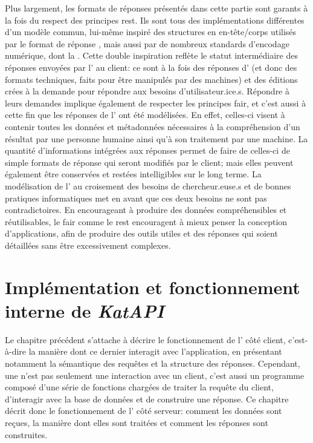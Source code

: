 Plus largement, les formats de réponses présentés dans cette partie sont garants à la fois du respect des principes \gls{rest}. Ils sont tous des implémentations différentes d'un modèle commun, lui-même inspiré des structures en en-tête/corps utilisés par le format de réponse \sparql{}, mais aussi par de nombreux standards d'encodage numérique, dont la \tei{}. Cette double inspiration reflète le statut intermédiaire des réponses envoyées par l'\api{} au client: ce sont à la fois des réponses d'\api{} (et donc des formats techniques, faits pour être manipulés par des machines) et des éditions crées à la demande pour répondre aux besoins d'utilisateur.ice.s. Répondre à leurs demandes implique également de respecter les principes \gls{fair}, et c'est aussi à cette fin que les réponses de l'\api{} ont été modélisées. En effet, celles-ci visent à contenir toutes les données et métadonnées nécessaires à la compréhension d'un résultat par une personne humaine ainsi qu'à son traitement par une machine. La quantité d'informations intégrées aux réponses permet de faire de celles-ci de simple formats de réponse qui seront modifiés par le client; mais elles peuvent également être conservées et restées intelligibles sur le long terme. La modélisation de l'\api{} au croisement des besoins de chercheur.euse.s et de bonnes pratiques informatiques met en avant que ces deux besoins ne sont pas contradictoires. En encourageant à produire des données compréhensibles et réutilisables, le \gls{fair} comme le \gls{rest} encouragent à mieux penser la conception d'applications, afin de produire des outils utiles et des réponses qui soient détaillées sans être excessivement complexes.

\chapter{Implémentation et fonctionnement interne de \textit{KatAPI}}
Le chapitre précédent s'attache à décrire le fonctionnement de l'\api{} côté client, c'est-à-dire la manière dont ce dernier interagit avec l'application, en présentant notamment la sémantique des requêtes et la structure des réponses. Cependant, une \api{} n'est pas seulement une interaction avec un client, c'est aussi un programme composé d'une série de fonctions chargées de traiter la requête du client, d'interagir avec la base de données et de construire une réponse. Ce chapitre décrit donc le fonctionnement de l'\api{} côté serveur: comment les données sont reçues, la manière dont elles sont traitées et comment les réponses sont construites.

